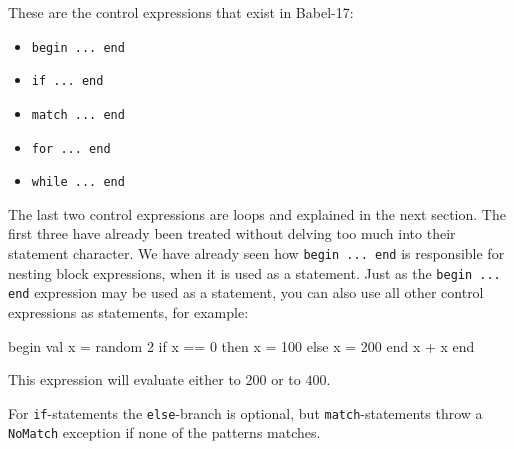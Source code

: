 \documentclass[11pt]{amsart}
\newcommand{\babelsrc}[1] {\lstinline!#1!}
\begin{document}
These are the control expressions that exist in Babel-17:
\begin{itemize}
\item \babelsrc{begin ... end}
\item \babelsrc{if ... end}
\item \babelsrc{match ... end}
\item \babelsrc{for ... end}
\item \babelsrc{while ... end}
\end{itemize}
The last two control expressions are loops and explained in the next section. The first three have already been treated without delving too much into their statement character. We have already seen how  \babelsrc{begin ... end} is responsible for nesting block expressions, when it is used as a statement.  Just as  the \babelsrc{begin ... end} expression may be used as a statement, 
you can also use all other control expressions as statements, for example:
\begin{babellisting}
begin
  val x = random 2
  if x == 0 then
    x = 100
  else
    x = 200
  end
  x + x
end
\end{babellisting}
This expression will evaluate either to $200$ or to $400$.

For \babelsrc{if}-statements the \babelsrc{else}-branch is optional, but \babelsrc{match}-statements throw a \babelsrc{NoMatch} exception if none of the patterns matches. 
\end{document}
